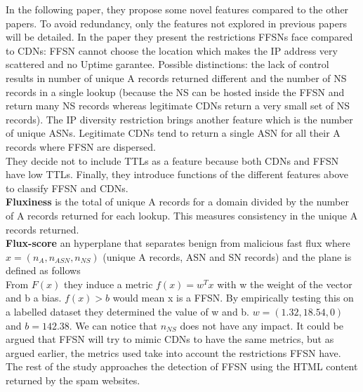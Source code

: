 In the following paper\cite{ff3}, they propose some novel features compared to the other papers. To avoid redundancy, only the features not explored in previous papers will be detailed. In the paper they present the restrictions FFSNs face compared to CDNs: FFSN cannot choose the location which makes the IP address very scattered and no Uptime garantee. Possible distinctions: the lack of control results in number of unique A records returned different and the number of NS records in a single lookup (because the NS can be hosted inside the FFSN and return many NS records whereas legitimate CDNs return a very small set of NS records). The IP diversity restriction brings another feature which is the number of unique ASNs. Legitimate CDNs tend to return a single ASN for all their A records where FFSN are dispersed.\\
They decide not to include TTLs as a feature because both CDNs and FFSN have low TTLs. Finally,  they introduce functions of the different features above to classify FFSN and CDNs.\\
\textbf{Fluxiness} is the total of unique A records for a domain divided by the number of A records returned for each lookup. This measures consistency in the unique A records returned. \\
\textbf{Flux-score} an hyperplane that separates benign from malicious fast flux where $ x = (n_A,n_{ASN},n_{NS})$ (unique A records, ASN and SN records) and the plane is defined as follows\\
From $F(x)$ they induce a metric $f(x) = w^Tx$ with w the weight of the vector and b a bias. $f(x) > b$ would mean x is a FFSN. By empirically testing this on a labelled dataset they determined the value of w and b. $w = (1.32,18.54,0)$ and $b =142.38$. We can notice that $n_{NS}$ does not have any impact. It could be argued that FFSN will try to mimic CDNs to have the same metrics, but as argued earlier, the metrics used take into account the restrictions FFSN have. The rest of the study approaches the detection of FFSN using the HTML content returned by the spam websites.\\

